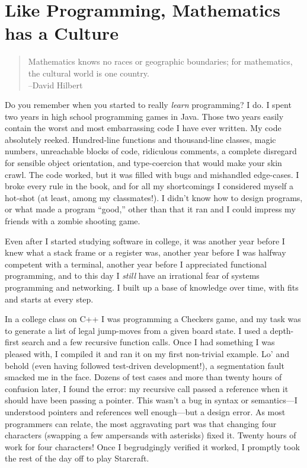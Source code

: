 \chapter{Like Programming, Mathematics has a Culture}

\begin{quote}

Mathematics knows no races or geographic boundaries; for mathematics, the
cultural world is one country. \\

--David Hilbert

\end{quote}

Do you remember when you started to really \emph{learn} programming? I do. I
spent two years in high school programming games in Java. Those two years
easily contain the worst and most embarrassing code I have ever written.  My
code absolutely reeked. Hundred-line functions and thousand-line classes, magic
numbers, unreachable blocks of code, ridiculous comments, a complete disregard
for sensible object orientation, and type-coercion that would make your skin
crawl. The code worked, but it was filled with bugs and mishandled edge-cases.
I broke every rule in the book, and for all my shortcomings I considered myself
a hot-shot (at least, among my classmates!). I didn't know how to design
programs, or what made a program ``good,'' other than that it ran and I could
impress my friends with a zombie shooting game.

Even after I started studying software in college, it was another year before I
knew what a stack frame or a register was, another year before I was halfway
competent with a terminal, another year before I appreciated functional
programming, and to this day I \emph{still} have an irrational fear of systems
programming and networking. I built up a base of knowledge over time, with fits
and starts at every step.

In a college class on C++ I was programming a Checkers game, and my task was to
generate a list of legal jump-moves from a given board state. I used a
depth-first search and a few recursive function calls. Once I had something I
was pleased with, I compiled it and ran it on my first non-trivial example. Lo'
and behold (even having followed test-driven development!), a segmentation
fault smacked me in the face. Dozens of test cases and more than twenty hours
of confusion later, I found the error: my recursive call passed a reference
when it should have been passing a pointer. This wasn't a bug in syntax or
semantics---I understood pointers and references well enough---but a design
error. As most programmers can relate, the most aggravating part was that
changing four characters (swapping a few ampersands with asterisks) fixed it.
Twenty hours of work for four characters! Once I begrudgingly verified it
worked, I promptly took the rest of the day off to play Starcraft.

